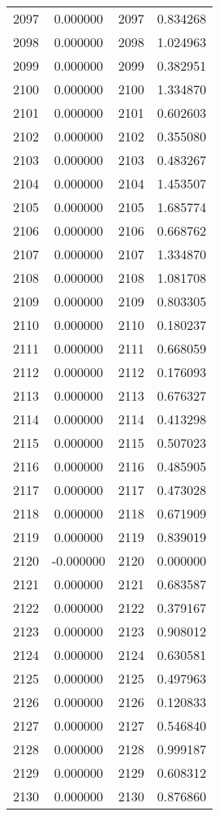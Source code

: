 \documentclass[12pt]{article}
\begin{document}
\begin{longtable}{@{}cccc@{}}
2097 & 0.000000 & 2097 & 0.834268 \\
2098 & 0.000000 & 2098 & 1.024963 \\
2099 & 0.000000 & 2099 & 0.382951 \\
2100 & 0.000000 & 2100 & 1.334870 \\
2101 & 0.000000 & 2101 & 0.602603 \\
2102 & 0.000000 & 2102 & 0.355080 \\
2103 & 0.000000 & 2103 & 0.483267 \\
2104 & 0.000000 & 2104 & 1.453507 \\
2105 & 0.000000 & 2105 & 1.685774 \\
2106 & 0.000000 & 2106 & 0.668762 \\
2107 & 0.000000 & 2107 & 1.334870 \\
2108 & 0.000000 & 2108 & 1.081708 \\
2109 & 0.000000 & 2109 & 0.803305 \\
2110 & 0.000000 & 2110 & 0.180237 \\
2111 & 0.000000 & 2111 & 0.668059 \\
2112 & 0.000000 & 2112 & 0.176093 \\
2113 & 0.000000 & 2113 & 0.676327 \\
2114 & 0.000000 & 2114 & 0.413298 \\
2115 & 0.000000 & 2115 & 0.507023 \\
2116 & 0.000000 & 2116 & 0.485905 \\
2117 & 0.000000 & 2117 & 0.473028 \\
2118 & 0.000000 & 2118 & 0.671909 \\
2119 & 0.000000 & 2119 & 0.839019 \\
2120 & -0.000000 & 2120 & 0.000000 \\
2121 & 0.000000 & 2121 & 0.683587 \\
2122 & 0.000000 & 2122 & 0.379167 \\
2123 & 0.000000 & 2123 & 0.908012 \\
2124 & 0.000000 & 2124 & 0.630581 \\
2125 & 0.000000 & 2125 & 0.497963 \\
2126 & 0.000000 & 2126 & 0.120833 \\
2127 & 0.000000 & 2127 & 0.546840 \\
2128 & 0.000000 & 2128 & 0.999187 \\
2129 & 0.000000 & 2129 & 0.608312 \\
2130 & 0.000000 & 2130 & 0.876860 \\

\end{longtable}
\end{document}
